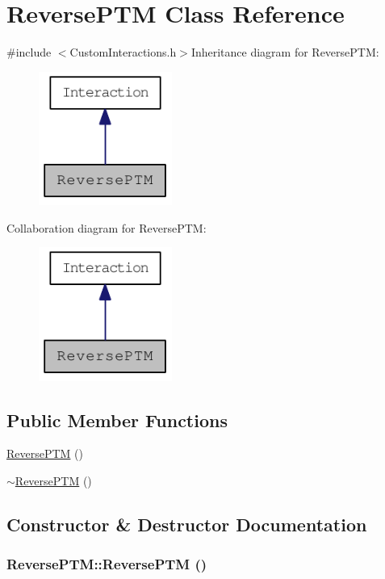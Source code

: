 \hypertarget{classReversePTM}{
\section{ReversePTM Class Reference}
\label{classReversePTM}
}


{\ttfamily \#include $<$CustomInteractions.h$>$}Inheritance diagram for ReversePTM:\nopagebreak
\begin{figure}[H]
\begin{center}
\leavevmode
\includegraphics[width=124pt]{classReversePTM__inherit__graph}
\end{center}
\end{figure}
Collaboration diagram for ReversePTM:\nopagebreak
\begin{figure}[H]
\begin{center}
\leavevmode
\includegraphics[width=124pt]{classReversePTM__coll__graph}
\end{center}
\end{figure}
\subsection*{Public Member Functions}
\begin{DoxyCompactItemize}
\item 
\hyperlink{classReversePTM_a300458e98e0701ca87cf608eca89b3b3}{ReversePTM} ()
\item 
\hyperlink{classReversePTM_a338b4f272334ae707b910fcee0f86ffc}{$\sim$ReversePTM} ()
\end{DoxyCompactItemize}


\subsection{Constructor \& Destructor Documentation}
\hypertarget{classReversePTM_a300458e98e0701ca87cf608eca89b3b3}{
\subsubsection[{ReversePTM}]{\setlength{\rightskip}{0pt plus 5cm}ReversePTM::ReversePTM ()}}
\label{classReversePTM_a300458e98e0701ca87cf608eca89b3b3}


